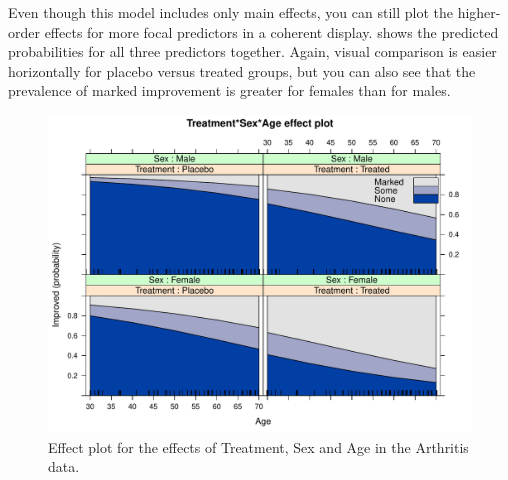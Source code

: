 \documentclass[11pt]{book}
\renewenvironment{knitrout}{\small\renewcommand{\baselinestretch}{.85}}{} %
\begin{document}
Even though this model includes only main effects, you can still plot the higher-order effects
for more focal predictors in a coherent display.   shows
the predicted probabilities for all three predictors together. Again, visual comparison is easier
horizontally for placebo versus treated groups, but you can also see that the prevalence of
marked improvement is greater for females than for males.
\begin{knitrout}
\color{fgcolor}\begin{kframe}
\begin{alltt}
\hlstd{(}\hlstd{(}\hlstd{(}\hlstd{,} \hlstd{,} 
     \hlstd{=}\hlstd{,} \hlstd{=}\hlstd{(}\hlstd{=}\hlstd{,} \hlstd{=}\hlstd{))}
\end{alltt}
\end{kframe}\begin{figure}[!htbp]


\centerline{\includegraphics[width=.9\textwidth]{ch07/fig/arth-po-eff2} }

\caption[Effect plot for the effects of Treatment, Sex and Age in the Arthritis data]{Effect plot for the effects of Treatment, Sex and Age in the Arthritis data.\label{fig:arth-po-eff2}}
\end{figure}


\end{knitrout}
\end{document}
